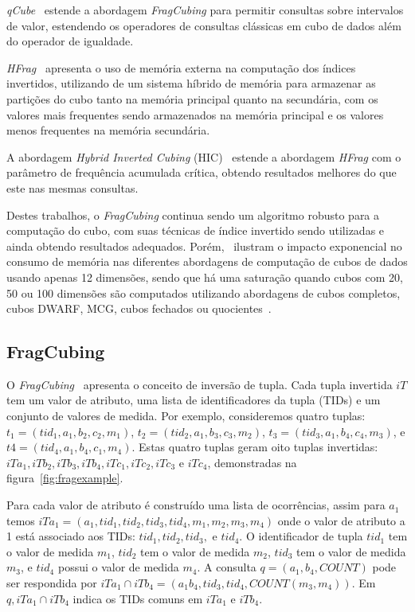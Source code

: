 \textit{qCube}~\cite{silvaQCubeEfficientIntegration2013} estende a abordagem \textit{FragCubing} para permitir consultas sobre intervalos de valor, estendendo os operadores de consultas clássicas em cubo de dados além do operador de igualdade.

\textit{HFrag}~\cite{silvaHybridMemoryData2015} apresenta o uso de memória externa na computação dos índices invertidos, utilizando de um sistema híbrido de memória para armazenar as partições do cubo tanto na memória principal quanto na secundária, com os valores mais frequentes sendo armazenados na memória principal e os valores menos frequentes na memória secundária.

A abordagem \textit{Hybrid Inverted Cubing} (HIC)~\cite{silvaComputingBIGData2016} estende a abordagem \textit{HFrag} com o parâmetro de frequência acumulada crítica, obtendo resultados melhores do que este nas mesmas consultas.

Destes trabalhos, o \textit{FragCubing} continua sendo um algoritmo robusto para a computação do cubo, com suas técnicas de índice invertido sendo utilizadas e ainda obtendo resultados adequados.
Porém,~ ilustram o impacto exponencial no consumo de memória nas diferentes abordagens de computação de cubos de dados usando apenas 12 dimensões, sendo que há uma saturação quando cubos com 20, 50 ou 100 dimensões são computados utilizando abordagens de cubos completos, cubos DWARF, MCG, cubos fechados ou quocientes~\cite{silva:2015:abordagensParaCubo}.

\subsection{FragCubing}\label{ch:corr:cube:frag}

O \textit{FragCubing}~\cite{liHighdimensionalOLAPMinimal2004} apresenta o conceito de inversão de tupla.
Cada tupla invertida $iT$ tem um valor de atributo, uma lista de identificadores da tupla (TIDs) e um conjunto de valores de medida.
Por exemplo, consideremos quatro tuplas: $t_1 = (tid_1, a_1, b_2, c_2, m_1)$, $t_2 = (tid_2, a_1, b_3, c_3, m_2)$, $t_3 = (tid_3, a_1, b_4, c_4, m_3)$, e $t4 = (tid_4, a_1, b_4, c_1, m_4)$.
Estas quatro tuplas geram oito tuplas invertidas: $iTa_1, iTb_2, iTb_3, iTb_4, iTc_1, iTc_2, iTc_3$ e $iTc_4$, demonstradas na figura~\ref{fig:fragexample}.

Para cada valor de atributo é construído uma lista de ocorrências, assim para $a_1$ temos $iTa_1 = (a_1, tid_1, tid_2, tid_3, tid_4, m_1, m_2, m_3, m_4)$ onde o valor de atributo a 1 está associado aos TIDs: $tid_1, tid_2, tid_3,$ e $tid_4$.
O identificador de tupla $tid_1$ tem o valor de medida $m_1$, $tid_2$ tem o valor de medida $m_2$, $tid_3$ tem o valor de medida $m_3$, e $tid_4$ possui o valor de medida $m_4$.
A consulta $q = (a_1, b_4, COUNT)$ pode ser respondida por $iTa_1 \cap iTb_4 = (a_1b_4, tid_3, tid_4, COUNT(m_3, m_4))$.
Em $q, iTa_1 \cap iTb_4$ indica os TIDs comuns em $iTa_1$ e $iTb_4$.

